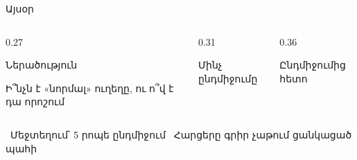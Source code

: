 \begin{frame}{Այսօր}
  \begin{columns}[T]
    \begin{column}{0.27\textwidth}
      \begin{card}[colback=butter!45!cream]
        {\blackfont Ներածություն}\par\smallskip
        Ի՞նչն է «նորմալ» ուղեղը, ու ո՞վ է դա որոշում
      \end{card}
    \end{column}
    \begin{column}{0.31\textwidth}
      \begin{card}[colback=lavender!45!cream]
        {\blackfont Մինչ ընդմիջումը}\par\smallskip
        \par\smallskip
      \end{card}
    \end{column}
    \begin{column}{0.36\textwidth}
      \begin{card}[colback=mint!45!cream]
        {\blackfont Ընդմիջումից հետո}\par\smallskip
        \par\smallskip
        \par\smallskip
      \end{card}
    \end{column}
  \end{columns}
  \vspace{3mm}
  \centering
  {\small {}\ Մեջտեղում՝ 5 րոպե ընդմիջում \qquad {}\ Հարցերը գրիր չաթում ցանկացած պահի}
\end{frame}
